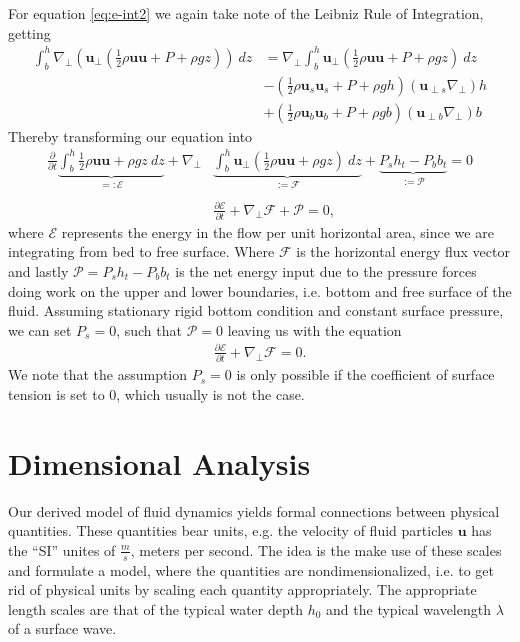 For equation \ref{eq:e-int2} we again take note of the Leibniz Rule of
Integration, getting
\begin{align}
    \int_b^h \nabla_\perp\left( \mathbf{u}_\perp\left(
    \frac{1}{2}\rho\mathbf{u}\mathbf{u}+P+\rho gz \right)  \right)\
    dz
    &= \nabla_\perp \int_b^h \mathbf{u}_\perp\left(
    \frac{1}{2}\rho\mathbf{u}\mathbf{u} + P + \rho g z \right) \ dz\\
    &- \left( \frac{1}{2}\rho \mathbf{u}_s\mathbf{u}_s + P + \rho g h \right)
    \left( \mathbf{u}_{\perp s} \nabla_\perp \right) h\\
    &+\left( \frac{1}{2}\rho \mathbf{u}_b\mathbf{u}_b + P + \rho g b \right)
    \left( \mathbf{u}_{\perp b} \nabla_\perp \right) b
\end{align}
Thereby transforming our equation into
\begin{align}
    \frac{\partial }{\partial t} \underbrace{\int_b^h \frac{1}{2}\rho
    \mathbf{u}\mathbf{u}+\rho g z\ dz}_{=:\mathcal{E}}
    + \nabla_\perp&\underbrace{\int_b^h
    \mathbf{u}_\perp\left( \frac{1}{2}\rho\mathbf{u}\mathbf{u} + \rho g z
\right)\ dz}_{:=\mathcal{F}}
+ \underbrace{P_s h_t - P_b b_t}_{:=\mathcal{P}} = 0\\
\nonumber\\
    &\frac{\partial \mathcal{E}}{\partial t}
    + \nabla_\perp \mathcal{F} + \mathcal{P} = 0,
\end{align}
where $\mathcal{E}$ represents the energy in the flow per unit horizontal
area, since we are integrating from bed to free surface. Where $\mathcal{F}$
is the horizontal energy flux vector and lastly $\mathcal{P} = P_s h_t -
P_b b_t$ is the net energy input due to the pressure forces doing work on the
upper and lower boundaries, i.e. bottom and free surface of the fluid.
Assuming stationary rigid bottom condition and constant surface pressure, we
can set $P_s=0$, such that $\mathcal{P} =0$ leaving us with the equation
\begin{align}
    \frac{\partial \mathcal{E}}{\partial t}
    + \nabla_\perp \mathcal{F} = 0.
\end{align}
We note that the assumption $P_s=0$ is only possible if the coefficient of
surface tension is set to 0, which usually is not the case.
\section{Dimensional Analysis}
Our derived model of fluid dynamics yields formal connections between
physical quantities. These quantities bear units, e.g. the velocity of fluid
particles $\mathbf{u}$ has the ``SI'' unites of $\frac{m}{s}$, meters per
second. The idea is the make use of these scales and formulate a model, where
the quantities are nondimensionalized, i.e. to get rid of physical units by
scaling each quantity appropriately. The appropriate length scales are that
of the typical water depth $h_0$ and the typical wavelength $\lambda$ of a
surface wave.

